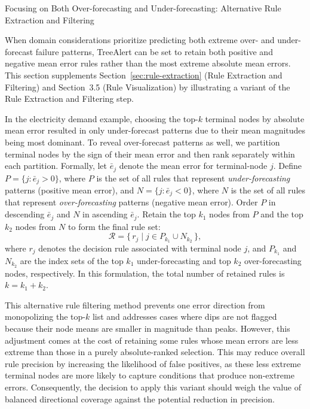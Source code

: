 \documentclass[ijds,sglanonrev]{informs4}
\begin{document}
\clearpage



\begin{APPENDIX}{Focusing on Both Over-forecasting and Under-forecasting: Alternative Rule Extraction and Filtering}
\label{append-A}

When domain considerations prioritize predicting both extreme over- and under-forecast failure patterns, TreeAlert can be set to retain both positive and negative mean error rules rather than the most extreme absolute mean errors. 
This section supplements Section~\ref{sec:rule-extraction} (Rule Extraction and Filtering) and Section~3.5 (Rule Visualization) by illustrating a variant of the Rule Extraction and Filtering step. 

In the electricity demand example, choosing the top-$k$ terminal nodes by absolute mean error resulted in only under-forecast patterns due to their mean magnitudes being most dominant. To reveal over-forecast patterns as well, we partition terminal nodes by the sign of their mean error and then rank separately within each partition. Formally, let $\bar e_j$ denote the mean error for terminal-node $j$. Define $P=\{j:\bar e_j>0\}$, where $P$ is the set of all rules that represent \textit{under-forecasting} patterns (positive mean error), and $N=\{j:\bar e_j<0\}$, where $N$ is the set of all rules that represent \textit{over-forecasting} patterns (negative mean error). Order $P$ in descending $\bar e_j$ and $N$ in ascending $\bar e_j$. Retain the top $k_1$ nodes from $P$ and the top $k_2$ nodes from $N$ to form the final rule set:
\begin{equation}
\mathcal{R} = \{\, r_j \;|\; j \in P_{k_1} \cup N_{k_2} \,\},
\end{equation}
where $r_j$ denotes the decision rule associated with terminal node $j$, and $P_{k_1}$ and $N_{k_2}$ are the index sets of the top $k_1$ under-forecasting and top $k_2$ over-forecasting nodes, respectively. In this formulation, the total number of retained rules is $k = k_1 + k_2$. 

This alternative rule filtering method prevents one error direction from monopolizing the top-$k$ list and addresses cases where dips are not flagged because their node means are smaller in magnitude than peaks. However, this adjustment comes at the cost of retaining some rules whose mean errors are less extreme than those in a purely absolute-ranked selection. This may reduce overall rule precision by increasing the likelihood of false positives, as these less extreme terminal nodes are more likely to capture conditions that produce non-extreme errors. Consequently, the decision to apply this variant should weigh the value of balanced directional coverage against the potential reduction in precision.


\end{APPENDIX}
\end{document}
